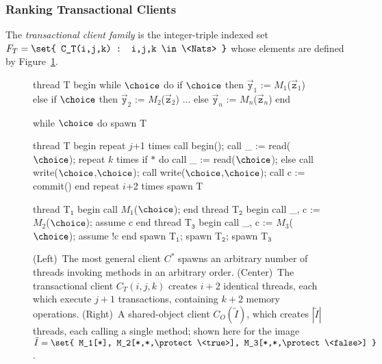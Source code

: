 \subsubsection{Ranking Transactional Clients}

\begin{definition}
  The \emph{transactional client family} is the integer-triple indexed 
  set $F_T = \set{ C_T(i,j,k) : i,j,k \in \<Nats> }$ whose elements are defined by  
  Figure~\ref{fig:clients}. 
\end{definition}

\begin{figure}[t]
  \begin{minipage}[b]{0.3\linewidth}
    \centering
    \scriptsize
    \begin{program}
thread T begin
  while $\choice$ do
    if $\choice$ then
      $\vec{\mathtt{y}}_1$ := $M_1$($\vec{\mathtt{z}}_1$)
    else if $\choice$ then
      $\vec{\mathtt{y}}_2$ := $M_2$($\vec{\mathtt{z}}_2$)
    ...
    else 
      $\vec{\mathtt{y}}_n$ := $M_n$($\vec{\mathtt{z}}_n$)
end

while $\choice$ do
  spawn T
    \end{program}    
  \end{minipage}
  \hfill
  \begin{minipage}[b]{0.3\linewidth}
    \centering
    \scriptsize
    \begin{program}
thread T begin
  repeat $j$+1 times
    call begin();
    call _ := read($\choice$);
    repeat $k$ times
      if $\ast$ do
        call _ := read($\choice$);
      else
        call write($\choice$,$\choice$);
    call write($\choice$,$\choice$);
    call c := commit()
end  
repeat $i$+2 times
  spawn T
    \end{program}
  \end{minipage}  
  \hfill
  \begin{minipage}[b]{0.3\linewidth}
    \centering
    \scriptsize
    \begin{program}
thread T$_\mathtt{1}$ begin
  call $M_1$($\choice$);
end      
thread T$_\mathtt{2}$ begin
  call _, c := $M_2$($\choice$);
  assume c
end      
thread T$_\mathtt{3}$ begin
  call _, c := $M_3$($\choice$);
  assume !c
end  
spawn T$_\mathtt{1}$;
spawn T$_\mathtt{2}$;
spawn T$_\mathtt{3}$
    \end{program}
  \end{minipage}
  \caption{({\sc Left})~The most general client $C^\ast$ spawns an arbitrary 
    number of threads invoking methods in an arbitrary order.
    ({\sc Center})~The transactional client $C_T(i,j,k)$ creates $i\!+\!2$ 
    identical threads, each which execute $j\!+\!1$ transactions, containing 
    $k\!+\!2$ memory operations.
    ({\sc Right})~A shared-object client $C_O(\tilde{I})$, which creates 
    $|\tilde{I}|$ threads, each calling a single method; shown here for the 
    image $\tilde{I} = \set{ M_1[*], M_2[*,*,\protect\<true>], 
    M_3[*,*,\protect\<false>] }$.}
  \label{fig:clients}
  \vspace{-5mm}
\end{figure}

